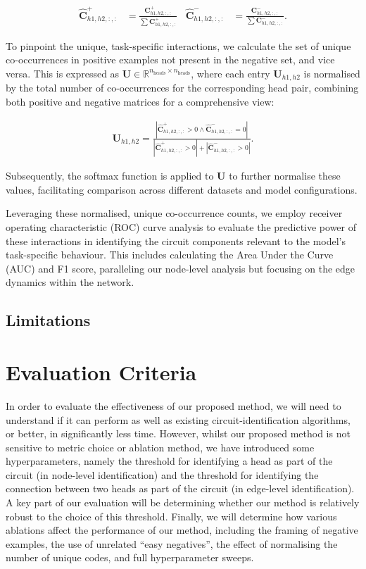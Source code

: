 \documentclass[11pt]{scrartcl}
\begin{document}
\begin{align*}
\mathbf{\hat{C}}^+_{h1,h2,:,:} &= \frac{\mathbf{C}^+_{h1,h2,:,:}}{\sum \mathbf{C}^+_{h1,h2,:,:}} & \mathbf{\hat{C}}^-_{h1,h2,:,:} &= \frac{\mathbf{C}^-_{h1,h2,:,:}}{\sum \mathbf{C}^-_{h1,h2,:,:}}.
\end{align*}

To pinpoint the unique, task-specific interactions, we calculate the set of unique co-occurrences in positive examples not present in the negative set, and vice versa. This is expressed as $\mathbf{U} \in \mathbb{R}^{n_{\text{heads}} \times n_{\text{heads}}}$, where each entry $\mathbf{U}_{h1,h2}$ is normalised by the total number of co-occurrences for the corresponding head pair, combining both positive and negative matrices for a comprehensive view:

\begin{align*}
\mathbf{U}_{h1,h2} = \frac{|\mathbf{\hat{C}}^+_{h1,h2,:,:} > 0 \land \mathbf{\hat{C}}^-_{h1,h2,:,:} = 0|}{|\mathbf{\hat{C}}^+_{h1,h2,:,:} > 0| + |\mathbf{\hat{C}}^-_{h1,h2,:,:} > 0|}.
\end{align*}

Subsequently, the softmax function is applied to $\mathbf{U}$ to further normalise these values, facilitating comparison across different datasets and model configurations.

Leveraging these normalised, unique co-occurrence counts, we employ receiver operating characteristic (ROC) curve analysis to evaluate the predictive power of these interactions in identifying the circuit components relevant to the model's task-specific behaviour. This includes calculating the Area Under the Curve (AUC) and F1 score, paralleling our node-level analysis but focusing on the edge dynamics within the network. 

\subsection{Limitations}

\section{Evaluation Criteria}

In order to evaluate the effectiveness of our proposed method, we will need to understand if it can perform as well as existing circuit-identification algorithms, or better, in significantly less time. However, whilst our proposed method is not sensitive to metric choice or ablation method, we have introduced some hyperparameters, namely the threshold for identifying a head as part of the circuit (in node-level identification) and the threshold for identifying the connection between two heads as part of the circuit (in edge-level identification). A key part of our evaluation will be determining whether our method is relatively robust to the choice of this threshold. Finally, we will determine how various ablations affect the performance of our method, including the framing of negative examples, the use of unrelated ``easy negatives'', the effect of normalising the number of unique codes, and full hyperparameter sweeps. 
\end{document}
